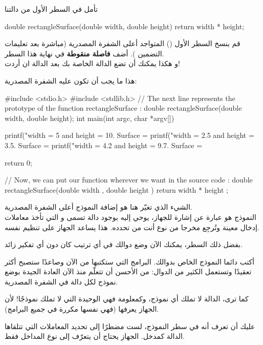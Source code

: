 تأمل في السطر الأول من دالتنا

\begin{Csource}
double rectangleSurface(double width, double height)
{
	return width * height;
}
\end{Csource}

قم بنسخ السطر الأول
()
المتواجد أعلى الشفرة المصدرية (مباشرة بعد تعليمات التضمين
). أضف
\textbf{فاصلة منقوطة}
في نهاية هذا السطر.\\
و هكذا يمكنك أن تضع الدالة الخاصة بك
بعد الدالة
ان أردت!

هذا ما يجب أن تكون عليه الشفرة المصدرية:

\begin{Csource}
#include <stdio.h>
#include <stdlib.h>
// The next line represents the prototype of the function rectangleSurface :
double rectangleSurface(double width, double height);
int main(int argc, char *argv[])
{
	printf("width = 5 and height = 10. Surface = %
	printf("width = 2.5 and height = 3.5. Surface = %
	printf("width = 4.2 and height = 9.7. Surface = %

	return 0;
}
// Now, we can put our function wherever we want in the source code :
double rectangleSurface(double width , double height )
{
	return width * height ;
}
\end{Csource}

الشيء الذي تغيّر هنا هو إضافة النموذج أعلى الشفرة المصدرية.\\
النموذج هو عبارة عن إشارة للجهاز، يوحي إليه بوجود دالة تسمى
و التي تأخذ معاملات إدخال معينة وتُرجِع مخرجا من نوع أنت من تحدده. هذا يساعد الجهاز على تنظيم نفسه.

بفضل ذلك السطر، يمكنك الآن وضع دوالك في أي ترتيب كان دون أي تفكير زائد.

أكتب دائما النموذج الخاص بدوالك. البرامج التي ستكتبها من الآن وصاعدًا ستصبح أكثر تعقيدًا وتستعمل الكثير من الدوال: من الأحسن أن تتعلّم منذ الآن العادة الجيدة  بوضع نموذج لكل دالة في الشفرة المصدرية.

كما ترى، الدالة
لا تملك أي نموذج، وكمعلومة فهي الوحيدة التي لا تملك نموذجًا! لأن الجهاز يعرفها (فهي نفسها مكررة في جميع البرامج).

عليك أن تعرف أنه في سطر النموذج، لست مضطرًا إلى تحديد المعاملات التي تتلقاها الدالة كمدخل. الجهاز يحتاج أن يتعرّف إلى نوع المداخل فقط.

